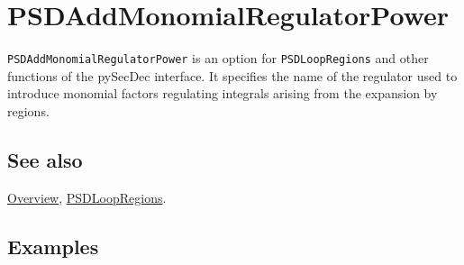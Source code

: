 \documentclass[../FeynHelpersManual.tex]{subfiles}
\begin{document}
\hypertarget{psdaddmonomialregulatorpower}{
\section{PSDAddMonomialRegulatorPower}\label{psdaddmonomialregulatorpower}}

\texttt{PSDAddMonomialRegulatorPower} is an option for
\texttt{PSDLoopRegions} and other functions of the pySecDec interface.
It specifies the name of the regulator used to introduce monomial
factors regulating integrals arising from the expansion by regions.

\subsection{See also}

\hyperlink{toc}{Overview}, \hyperlink{psdloopregions}{PSDLoopRegions}.

\subsection{Examples}
\end{document}
